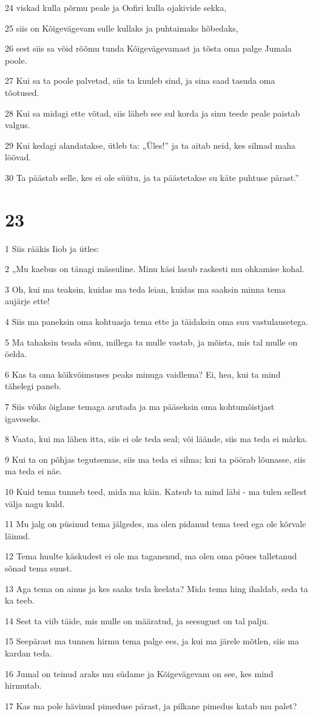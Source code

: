 \par 24 viskad kulla põrmu peale ja Oofiri kulla ojakivide sekka,
\par 25 siis on Kõigevägevam sulle kullaks ja puhtaimaks hõbedaks,
\par 26 sest siis sa võid rõõmu tunda Kõigevägevamast ja tõsta oma palge Jumala poole.
\par 27 Kui sa ta poole palvetad, siis ta kuuleb sind, ja sina saad tasuda oma tõotused.
\par 28 Kui sa midagi ette võtad, siis läheb see sul korda ja sinu teede peale paistab valgus.
\par 29 Kui kedagi alandatakse, ütleb ta: „Üles!” ja ta aitab neid, kes silmad maha löövad.
\par 30 Ta päästab selle, kes ei ole süütu, ja ta päästetakse su käte puhtuse pärast.”

\chapter{23}

\par 1 Siis rääkis Iiob ja ütles:
\par 2 „Mu kaebus on tänagi mässuline. Minu käsi lasub raskesti mu ohkamise kohal.
\par 3 Oh, kui ma teaksin, kuidas ma teda leian, kuidas ma saaksin minna tema aujärje ette!
\par 4 Siis ma paneksin oma kohtuasja tema ette ja täidaksin oma suu vastulausetega.
\par 5 Ma tahaksin teada sõnu, millega ta mulle vastab, ja mõista, mis tal mulle on öelda.
\par 6 Kas ta oma kõikvõimsuses peaks minuga vaidlema? Ei, hea, kui ta mind tähelegi paneb.
\par 7 Siis võiks õiglane temaga arutada ja ma pääseksin oma kohtumõistjast igaveseks.
\par 8 Vaata, kui ma lähen itta, siis ei ole teda seal; või läände, siis ma teda ei märka.
\par 9 Kui ta on põhjas tegutsemas, siis ma teda ei silma; kui ta pöörab lõunasse, siis ma teda ei näe.
\par 10 Kuid tema tunneb teed, mida ma käin. Katsub ta mind läbi - ma tulen sellest välja nagu kuld.
\par 11 Mu jalg on püsinud tema jälgedes, ma olen pidanud tema teed ega ole kõrvale läinud.
\par 12 Tema huulte käskudest ei ole ma taganenud, ma olen oma põues talletanud sõnad tema suust.
\par 13 Aga tema on ainus ja kes saaks teda keelata? Mida tema hing ihaldab, seda ta ka teeb.
\par 14 Sest ta viib täide, mis mulle on määratud, ja seesugust on tal palju.
\par 15 Seepärast ma tunnen hirmu tema palge ees, ja kui ma järele mõtlen, siis ma kardan teda.
\par 16 Jumal on teinud araks mu südame ja Kõigevägevam on see, kes mind hirmutab.
\par 17 Kas ma pole hävinud pimeduse pärast, ja pilkane pimedus katab mu palet?

